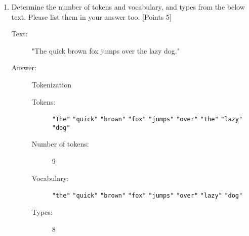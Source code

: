 \documentclass[12pt]{article}
\begin{document}
\begin{enumerate}
    \item Determine the number of tokens and vocabulary, and types from the
          below text. Please list them in your answer too. [Points 5]
          \begin{description}
              \item[Text:] "The quick brown fox jumps over the lazy dog."
              \item[Answer:] Tokenization
                  \begin{description}
                      \item[Tokens: ] \verb/"The"/ \verb/"quick"/ \verb/"brown"/
                          \verb/"fox"/ \verb/"jumps"/ \verb/"over"/ \verb/"the"/
                          \verb/"lazy"/ \verb/"dog"/
                      \item[Number of tokens:] 9
                      \item[Vocabulary: ] \verb/"the"/ \verb/"quick"/
                          \verb/"brown"/ \verb/"fox"/ \verb/"jumps"/ \verb/"over"/
                          \verb/"lazy"/ \verb/"dog"/
                      \item[Types: ] 8
                  \end{description}
          \end{description}


\end{enumerate}
\end{document}
